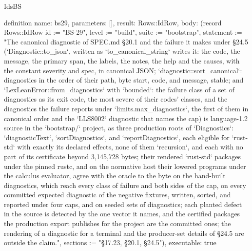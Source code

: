\begin{lexlean}{IdsBS}
\begin{semanticmodule}
definition{
  name: bs29,
  parameters: [],
  result: Rows::IdRow,
  body: (record Rows::IdRow {id := "BS-29", level := "build", suite := "bootstrap", statement := "The canonical diagnostic of SPEC.md §20.1 and the failure it makes under §24.5 (`Diagnostic::to_json`, written as `to_canonical_string` writes it: the code, the message, the primary span, the labels, the notes, the help and the causes, with the constant severity and spec, in canonical JSON; `diagnostic::sort_canonical`: diagnostics in the order of their path, byte start, code, and message, stable; and `LexLeanError::from_diagnostics` with `bounded`: the failure class of a set of diagnostics as its exit code, the most severe of their codes' classes, and the diagnostics the failure reports under `limits.max_diagnostics`, the first of them in canonical order and the `LLS8002` diagnostic that names the cap) is language-1.2 source in the `bootstrap/` project, as three production roots of `Diagnostics`: `diagnosticText`, `sortDiagnostics`, and `reportDiagnostics`, each eligible for `rust-std` with exactly its declared effects, none of them `recursion`, and each with no part of its certificate beyond 3,145,728 bytes; their rendered `rust-std` packages under the pinned rustc, and on the normative host their lowered programs under the calculus evaluator, agree with the oracle to the byte on the hand-built diagnostics, which reach every class of failure and both sides of the cap, on every committed expected diagnostic of the negative fixtures, written, sorted, and reported under four caps, and on seeded sets of diagnostics; each planted defect in the source is detected by the one vector it names, and the certified packages the production export publishes for the project are the committed ones; the rendering of a diagnostic for a terminal and the producer-set details of §24.5 are outside the claim.", sections := "§17.23, §20.1, §24.5"}),
  executable: true
}


\end{semanticmodule}
\end{lexlean}
